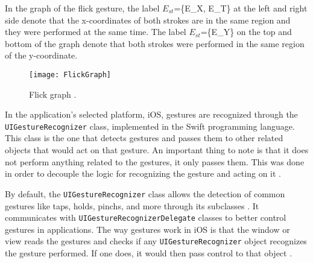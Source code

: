 \begin{comment}
\begin{figure}[H]
	\centering
	\texttt{[image: Flick]}
    \caption{Flick gesture \citep{chen2014agraph}}
    \label{fig:flick}
\end{figure}

\begin{figure}[H]
\centering
\begin{minipage}{.4\textwidth}
	\centering
	\texttt{[image: SpatialRelation]}
    \caption{}
    \label{fig:spatial-relation}
\end{minipage}
\begin{minipage}{.4\textwidth}
	\centering
	\texttt{[image: TimeDuration]}
    \caption{}
    \label{fig:time-duration}
\end{minipage}
\end{figure}
\end{comment}
In the graph of the flick gesture, the label $E_{st}$=\{E\_X, E\_T\} at the left and right side denote that the x-coordinates of both strokes are in the same region and they were performed at the same time. The label $E_{st}$=\{E\_Y\} on the top and bottom of the graph denote that both strokes were performed in the same region of the y-coordinate.

\begin{figure}[H]
	\centering
	\texttt{[image: FlickGraph]}
    \caption{Flick graph \citep{chen2014agraph}.}
    \label{fig:flick-graph}
\end{figure}

In the application's selected platform, iOS, gestures are recognized through the \texttt{UIGestureRecognizer} class, implemented in the Swift programming language. This class is the one that detects gestures and passes them to other related objects that would act on that gesture. An important thing to note is that it does not perform anything related to the gestures, it only passes them. This was done in order to decouple the logic for recognizing the gesture and acting on it \citep{apple2017ui}.

By default, the \texttt{UIGestureRecognizer} class allows the detection of common gestures like taps, holds, pinchs, and more through its subclasses \citep{apple2017ui}. It communicates with \texttt{UIGestureRecognizerDelegate} classes to better control gestures in applications. The way gestures work in iOS is that the window or view reads the gestures and checks if any \texttt{UIGestureRecognizer} object recognizes the gesture performed. If one does, it would then pass control to that object \citep{apple2017ui}. 

